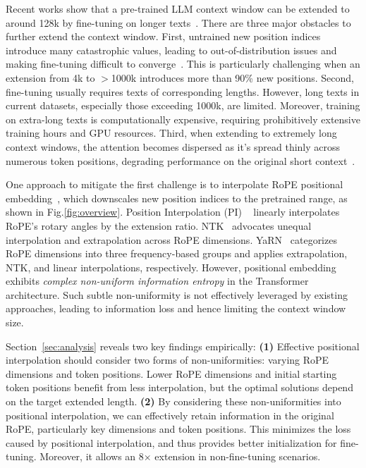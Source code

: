 Recent works show that a pre-trained LLM context window can be extended to around 128k by fine-tuning on longer texts~\cite{longlora,pi,yarn,zhang2024soaring,liu2023scaling}. There are three major obstacles to further extend the context window. First, untrained new position indices introduce many catastrophic values, leading to out-of-distribution issues and  making fine-tuning difficult to converge~\cite{pi}. This is particularly challenging when an extension from 4k to  $>$1000k introduces more than 90\% new positions. Second, fine-tuning usually requires texts of corresponding lengths. However, long texts in current datasets, especially those exceeding 1000k, are limited. Moreover, training on extra-long texts is computationally expensive, requiring prohibitively extensive training hours and GPU resources. Third, when extending to extremely long context windows, the attention becomes dispersed as it's spread thinly across numerous token positions, degrading performance on the original short context~\cite{pi}.

One approach to mitigate the first challenge is to interpolate RoPE positional embedding~\cite{rope,pi},  which downscales new position indices to the pretrained range, as shown in Fig.\ref{fig:overview}. Position Interpolation (PI) ~\cite{pi} linearly interpolates RoPE's rotary angles by the extension ratio. NTK~\cite{ntk,dynamicntk} advocates unequal interpolation and extrapolation across RoPE dimensions. YaRN~\cite{yarn} categorizes RoPE dimensions into three frequency-based groups and applies extrapolation, NTK, and linear interpolations, respectively. However,  positional embedding exhibits \emph{complex non-uniform information entropy} in the Transformer architecture. Such subtle non-uniformity is not effectively leveraged by existing approaches, leading to information loss and hence limiting the context window size.

Section~\ref{sec:analysis} reveals two key findings empirically: \textbf{(1)} Effective positional interpolation should consider two forms of non-uniformities: varying RoPE dimensions and token positions. Lower RoPE dimensions and initial starting token positions benefit from less interpolation, but the optimal solutions depend on the target extended length.
  \textbf{(2)} By considering these non-uniformities into positional interpolation, we can effectively retain information in the original RoPE,  particularly key dimensions and token positions. This minimizes the loss caused by positional interpolation, and thus provides better initialization for fine-tuning. Moreover, it  allows an 8$\times$ extension in non-fine-tuning scenarios. 

